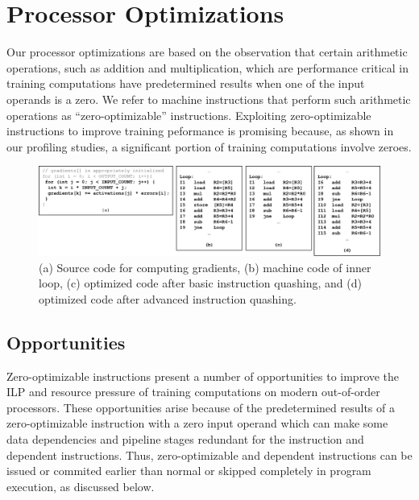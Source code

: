 \section{Processor Optimizations}
\label{sec:processor_opt}

Our processor optimizations are based on the observation that certain arithmetic operations, such as addition and multiplication, which are performance critical in training computations have predetermined results when one of the input operands is a zero. We refer to machine instructions that perform such arithmetic operations as ``zero-optimizable'' instructions. Exploiting zero-optimizable instructions to improve training peformance is promising because, as shown in our profiling studies, a significant portion of training computations involve zeroes. 

\begin{figure}
\centering
\includegraphics[width=1.9\columnwidth]{Figures/gradient_code_opt.png}
\caption{(a) Source code for computing gradients, (b) machine code of inner loop, (c) optimized code after basic instruction quashing, and (d) optimized code after advanced instruction quashing.}
\label{fig:gradient_code_opt}
\end{figure}

\subsection{Opportunities}

Zero-optimizable instructions present a number of opportunities to improve the ILP and resource pressure of training computations on modern out-of-order processors.  These opportunities arise because of the predetermined results of a zero-optimizable instruction with a zero input operand which can make some data dependencies and pipeline stages redundant for the instruction and dependent instructions.  Thus, zero-optimizable and dependent instructions can be issued or commited earlier than normal or skipped completely in program execution, as discussed below. 

